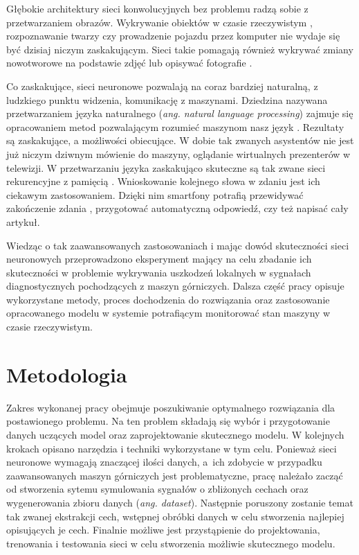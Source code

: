 \documentclass[inzynierska]{pwr_wmat_praca_dyplomowa}
\theoremstyle{plain}
\numberwithin{theorem}{chapter}
\theoremstyle{definition}
\numberwithin{theorem}{chapter}
\begin{document}
Głębokie architektury sieci konwolucyjnych bez problemu radzą sobie z przetwarzaniem obrazów. Wykrywanie obiektów w czasie rzeczywistym \cite{ren2015faster}, rozpoznawanie twarzy \cite{lin1997face} czy prowadzenie pojazdu \cite{bojarski2016end} przez komputer nie wydaje się być dzisiaj niczym zaskakującym. Sieci takie pomagają również wykrywać zmiany nowotworowe \cite{nnnature} na podstawie zdjęć lub opisywać fotografie \cite{xu2015show}.

Co zaskakujące, sieci neuronowe pozwalają na coraz bardziej naturalną, z ludzkiego punktu widzenia, komunikację z maszynami. Dziedzina nazywana przetwarzaniem języka naturalnego (\textit{ang. natural language processing}) zajmuje się opracowaniem metod pozwalającym rozumieć maszynom nasz język \cite{nnspeech}. Rezultaty są zaskakujące, a możliwości obiecujące. W dobie tak zwanych asystentów nie jest już niczym dziwnym mówienie do maszyny, oglądanie wirtualnych prezenterów w telewizji. W przetwarzaniu języka zaskakująco skuteczne są tak zwane sieci rekurencyjne z pamięcią \cite{tai2015improved}.  Wnioskowanie kolejnego słowa w zdaniu jest ich ciekawym zastosowaniem. Dzięki nim smartfony potrafią przewidywać zakończenie zdania \cite{nngboard}, przygotować automatyczną odpowiedź, czy też napisać cały artykuł.

Wiedząc o tak zaawansowanych zastosowaniach i mając dowód skuteczności sieci neuronowych przeprowadzono eksperyment mający na celu zbadanie ich skuteczności w problemie wykrywania uszkodzeń lokalnych w sygnałach diagnostycznych pochodzących z maszyn górniczych. Dalsza część pracy opisuje wykorzystane metody, proces dochodzenia do rozwiązania oraz zastosowanie opracowanego modelu w systemie potrafiącym monitorować stan maszyny w czasie rzeczywistym.

\chapter{Metodologia}
Zakres wykonanej pracy obejmuje poszukiwanie optymalnego rozwiązania dla postawionego problemu. Na ten problem składają się wybór i przygotowanie danych uczących model oraz zaprojektowanie skutecznego modelu. 
W kolejnych krokach opisano narzędzia i techniki wykorzystane w tym celu. Ponieważ sieci neuronowe wymagają znaczącej ilości danych, a~ich zdobycie w przypadku zaawansowanych maszyn górniczych jest problematyczne, pracę należało zacząć od stworzenia sytemu symulowania sygnałów o zbliżonych cechach oraz wygenerowania zbioru danych (\textit{ang. dataset}). Następnie poruszony zostanie temat tak zwanej ekstrakcji cech, wstępnej obróbki danych w celu stworzenia najlepiej opisujących je cech. Finalnie możliwe jest przystąpienie do projektowania, trenowania i testowania sieci w celu stworzenia możliwie skutecznego modelu.
\end{document}
